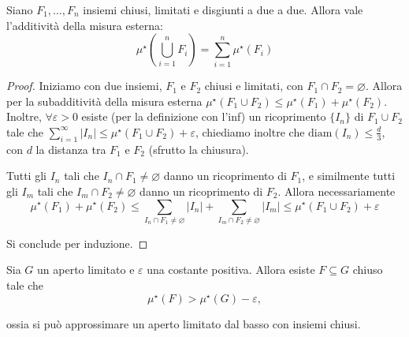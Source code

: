 \begin{proposition}\label{prop:prop_2}
    Siano \(F_{1}, \dots, F_{n}\) insiemi chiusi, limitati e disgiunti a due a
    due. Allora vale l'additività della misura esterna: \[\mu^\star \left( \bigcup_{i = 1}^{n}F_{i}  \right) = \sum_{i=1}^{n}
    \mu^{\star}(F_{i})\]
\end{proposition}
\begin{proof}
    Iniziamo con due insiemi, \(F_{1}\) e \(F_{2}\) chiusi e limitati, con
    \(F_{1} \cap F_{2} = \varnothing\). Allora per la subadditività della misura
    esterna \(\mu^{\star}(F_{1} \cup F_{2}) \le \mu^{\star}(F_{1}) +
    \mu^{\star}(F_{2})\). Inoltre, \(\forall \varepsilon > 0\) esiste (per la
    definizione con l'inf) un
    ricoprimento \(\{I_{n}\} \) di \(F_{1}\cup F_{2}\) tale che
    \(\sum_{i=1}^{\infty} |I_n| \leq \mu^\star\left( F_{1} \cup F_{2} \right) +
    \varepsilon\), chiediamo inoltre che \(\text{diam}(I_{n}) \le \frac{d}{3}\),
    con \(d\) la distanza tra \(F_{1}\) e \(F_{2}\) (sfrutto la chiusura).

    Tutti gli \(I_{n}\) tali che \(I_{n} \cap F_{1} \neq \varnothing\) danno un
    ricoprimento di \(F_{1}\), e similmente tutti gli \(I_{m}\) tali che \(I_{m}
    \cap F_{2} \neq\varnothing\) danno un ricoprimento di \(F_{2}\). Allora
    necessariamente \[\mu^\star(F_{1}) + \mu^\star(F_{2}) \le \sum_{I_{n}\cap
    F_{1}\neq\varnothing} |I_{n}| + \sum_{I_{m}\cap F_{2}\neq\varnothing}
|I_{m}| \le \mu^\star(F_{1} \cup F_{2}) + \varepsilon\]

    Si conclude per induzione.
\end{proof}
\begin{proposition}\label{prop:reticolazione}
    Sia \(G\) un aperto limitato e \(\varepsilon\) una costante positiva. Allora esiste \(F
    \subseteq G \) chiuso tale che 
    \[
        \mu^\star(F) > \mu^\star(G) - \varepsilon,
    \]

    ossia si può approssimare un aperto limitato dal basso con insiemi chiusi. 
\end{proposition}
